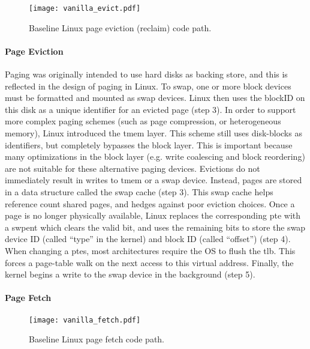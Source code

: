\begin{figure}[h] \centering
  \texttt{[image: vanilla\_evict.pdf]}
  \caption{Baseline Linux page eviction (reclaim) code path.}
  \label{fig:vanilla_evict}
\end{figure}

\paragraph{Page Eviction}
Paging was originally intended to use hard disks as backing store, and this is
reflected in the design of paging in Linux. To swap, one or more block
devices must be formatted and mounted as swap devices. Linux then uses the
blockID on this disk as a unique identifier for an evicted page (step 3). In
order to support more complex paging schemes (such as page compression, or
heterogeneous memory), Linux introduced the \gls{tmem} layer\cite{tmem}. This
scheme still uses disk-blocks as identifiers, but completely bypasses the block
layer. This is important because many optimizations in the block layer (e.g.
write coalescing and block reordering) are not suitable for these alternative
paging devices. Evictions do not immediately result in writes to \gls{tmem} or
a swap device. Instead, pages are stored in a data structure called the swap
cache (step 3). This swap cache helps reference count shared pages, and hedges
against poor eviction choices. Once a page is no longer physically available,
Linux replaces the corresponding \gls{pte} with a \gls{swpent} which clears the
valid bit, and uses the remaining bits to store the swap device ID (called
``type'' in the kernel) and block ID (called ``offset'') (step 4).  When
changing a \glspl{pte}, most architectures require the OS to flush the
\gls{tlb}. This forces a page-table walk on the next access to this virtual
address. Finally, the kernel begins a write to the swap device in the
background (step 5).

\paragraph{Page Fetch}

\begin{figure}[h] \centering
  \texttt{[image: vanilla\_fetch.pdf]}
  \caption{Baseline Linux page fetch code path.}
  \label{fig:vanilla_fetch}
\end{figure}


